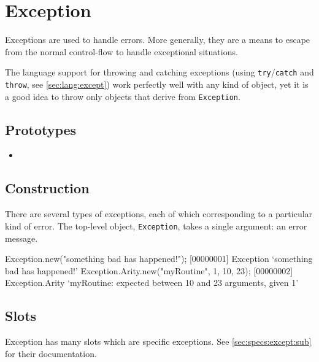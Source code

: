 \section{Exception}

Exceptions are used to handle errors.  More generally, they are a
means to escape from the normal control-flow to handle exceptional
situations.

The language support for throwing and catching exceptions (using
\lstinline|try|/\lstinline|catch| and \lstinline|throw|, see
\autoref{sec:lang:except}) work perfectly well with any kind of
object, yet it is a good idea to throw only objects that derive from
\lstinline|Exception|.

\subsection{Prototypes}
\begin{itemize}
\item {}
\end{itemize}

\subsection{Construction}

There are several types of exceptions, each of which corresponding to
a particular kind of error.  The top-level object,
\lstinline|Exception|, takes a single argument: an error message.

\begin{urbiscript}[firstnumber=1]
Exception.new("something bad has happened!");
[00000001] Exception `something bad has happened!'
Exception.Arity.new("myRoutine", 1, 10, 23);
[00000002] Exception.Arity `myRoutine: expected between 10 and 23 arguments, given 1'
\end{urbiscript}


\subsection{Slots}

Exception has many slots which are specific exceptions.  See
\autoref{sec:specs:except:sub} for their documentation.


